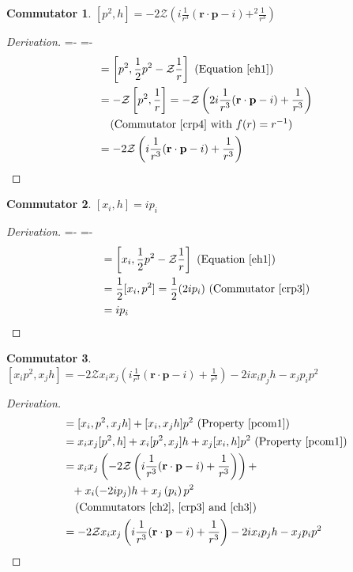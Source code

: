 \documentclass[12pt,a4paper]{report}
\theoremstyle{definition}
\newtheorem{commutator}{Commutator}[section]
\newenvironment{derivation}
  {\renewcommand\qedsymbol{$\square$}\begin{proof}[Derivation]}
  {\end{proof}}
\theoremstyle{remark}
\theoremstyle{remark}
\begin{document}
\begin{appendices}
\begin{commutator}\label{ch3}
$[p^2,h]=-2\mathcal{Z}\left(i\frac{1}{r^3}(\textbf{r}\cdot\textbf{p}-i)+^2\frac{1}{r^3}\right)$
\end{commutator}
\begin{derivation}
\abovedisplayskip=-\baselineskip
\belowdisplayskip=0pt
\abovedisplayshortskip=-\baselineskip
\belowdisplayshortskip=0pt
\begin{align*}
[p^2,h] &= \left[p^2,\frac{1}{2}p^2-\mathcal{Z}\frac{1}{r}\right] \text{ (Equation~\ref{eh1})} \\
&= -\mathcal{Z}\left[p^2,\frac{1}{r}\right] = -\mathcal{Z}\left(2i\frac{1}{r^3}(\textbf{r}\cdot\textbf{p}-i)+\frac{1}{r^3}\right) \\
&\phantom{=}\text{ (Commutator~\ref{crp4} with }f(r)=r^{-1}) \\
&= -2\mathcal{Z}\left(i\frac{1}{r^3}(\textbf{r}\cdot\textbf{p}-i)+\frac{1}{r^3}\right)
\end{align*}
\end{derivation}

\begin{commutator}\label{ch4}
$[x_i,h]=ip_i$
\end{commutator}
\begin{derivation}
\abovedisplayskip=-\baselineskip
\belowdisplayskip=0pt
\abovedisplayshortskip=-\baselineskip
\belowdisplayshortskip=0pt
\begin{align*}
[x_i,h] &= \left[x_i,\frac{1}{2}p^2-\mathcal{Z}\frac{1}{r}\right] \text{ (Equation~\ref{eh1})} \\
&= \frac{1}{2}[x_i,p^2] =\frac{1}{2}(2i p_i) \text{ (Commutator~\ref{crp3})} \\
&= ip_i
\end{align*}
\end{derivation}

\begin{commutator}\label{ch5}
$[x_ip^2,x_jh]=-2\mathcal{Z}x_ix_j\left(i\frac{1}{r^3}(\textbf{r}\cdot\textbf{p}-i)+\frac{1}{r^3}\right)-2i x_ip_jh-x_jp_ip^2$
\end{commutator}
\begin{derivation}
\begin{align*}
[x_ip^2,x_jh] &= [x_i,p^2,x_jh]+[x_i,x_jh]p^2 \text{ (Property~\ref{pcom1})}\\
&= x_ix_j[p^2,h]+x_i[p^2,x_j]h+x_j[x_i,h]p^2 \text{ (Property~\ref{pcom1})}\\
&= x_ix_j\left(-2\mathcal{Z}\left(i\frac{1}{r^3}(\textbf{r}\cdot\textbf{p}-i)+\frac{1}{r^3}\right)\right)+ \\
&\phantom{=} +x_i(-2i p_j)h+x_j\left(p_i\right)p^2 \\
&\phantom{=}\text{ (Commutators~\ref{ch2},~\ref{crp3} and~\ref{ch3})} \\
&=-2\mathcal{Z}x_ix_j\left(i\frac{1}{r^3}(\textbf{r}\cdot\textbf{p}-i)+\frac{1}{r^3}\right)-2i x_ip_jh-x_jp_ip^2
\end{align*}
\end{derivation}


\end{appendices}
\end{document}

